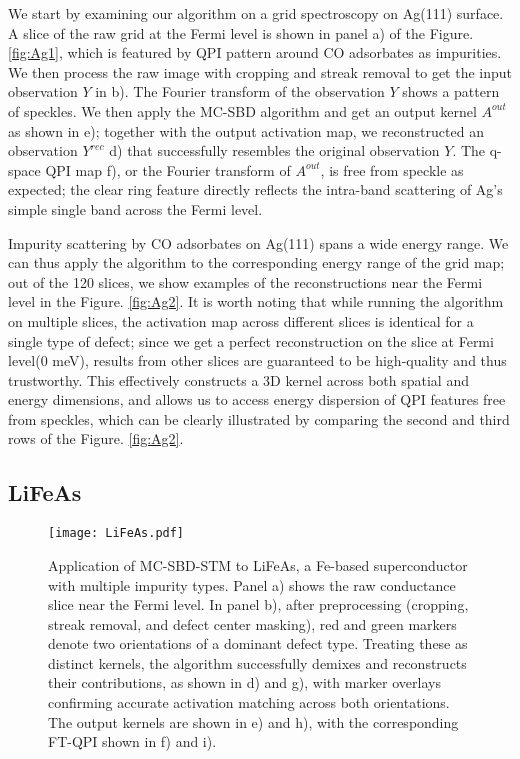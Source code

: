 We start by examining our algorithm on a grid spectroscopy on Ag(111) surface. A slice of the raw grid at the Fermi level is shown in panel a) of the Figure. \ref{fig:Ag1}, which is featured by QPI pattern around CO adsorbates as impurities. We then process the raw image with cropping and streak removal to get the input observation $Y$ in b). The Fourier transform of the observation $Y$ shows a pattern of speckles. We then apply the \ac{MC-SBD} algorithm and get an output kernel $A^{out}$ as shown in e); together with the output activation map, we reconstructed an observation $Y^{rec}$ d) that successfully resembles the original observation $Y$. The q-space QPI map f), or the Fourier transform of $A^{out}$, is free from speckle as expected; the clear ring feature directly reflects the intra-band scattering of Ag's simple single band across the Fermi level. 

Impurity scattering by CO adsorbates on Ag(111) spans a wide energy range. We can thus apply the algorithm to the corresponding energy range of the grid map; out of the 120 slices, we show examples of the reconstructions near the Fermi level in the Figure. \ref{fig:Ag2}. It is worth noting that while running the algorithm on multiple slices, the activation map across different slices is identical for a single type of defect; since we get a perfect reconstruction on the slice at Fermi level(0 meV), results from other slices are guaranteed to be high-quality and thus trustworthy. This effectively constructs a 3D kernel across both spatial and energy dimensions, and allows us to access energy dispersion of QPI features free from speckles, which can be clearly illustrated by comparing the second and third rows of the Figure. \ref{fig:Ag2}.
\subsection{LiFeAs}

\begin{figure}
	\texttt{[image: LiFeAs.pdf]} 
	\centering
	\caption{Application of MC-SBD-STM to LiFeAs, a Fe-based superconductor with multiple impurity types. Panel a) shows the raw conductance slice near the Fermi level. In panel b), after preprocessing (cropping, streak removal, and defect center masking), red and green markers denote two orientations of a dominant defect type. Treating these as distinct kernels, the algorithm successfully demixes and reconstructs their contributions, as shown in d) and g), with marker overlays confirming accurate activation matching across both orientations. The output kernels are shown in e) and h), with the corresponding FT-QPI shown in f) and i).}
	\label{fig:LiFeAs}
\end{figure}

